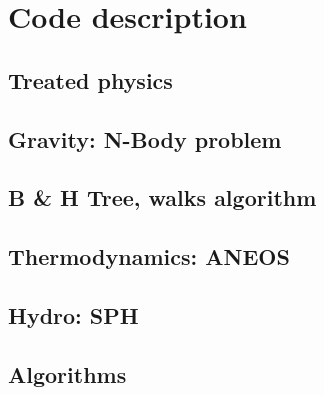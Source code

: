 \section{Code description}
%

\subsection{Treated physics}
\subsection{Gravity: N-Body problem}
\subsection{B \& H Tree, walks algorithm}
\subsection{Thermodynamics: ANEOS}
\subsection{Hydro: SPH}
\subsection{Algorithms}
\subsection{}


